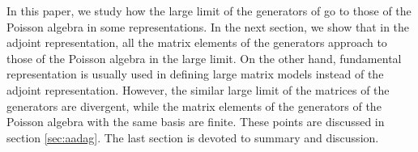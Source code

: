 \documentclass[a4paper,12pt]{article}
\begin{document}
In this paper, we study how the large \coordHE{} limit of the generators of
\coordHE{} go to those of the Poisson algebra in some representations.
In the next section, we show that in the adjoint representation, all
the matrix elements of the \coordHE{} generators approach to those of the
Poisson algebra in the large \coordHE{} limit.
On the other hand, fundamental representation is usually used in
defining large \coordHE{} matrix models instead of the adjoint
representation.
However, the similar large \coordHE{} limit of the \coordHE{} matrices
of the \coordHE{} generators are divergent, while the matrix elements of
the generators of the Poisson algebra with the same basis are finite.
These points are discussed in section \ref{sec:aadag}.
The last section is devoted to summary and discussion.
\end{document}
